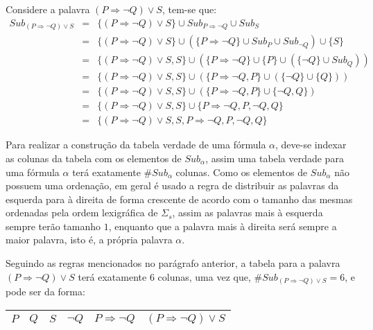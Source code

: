 \begin{exemplo}
  Considere a palavra $(P \Rightarrow \neg Q) \lor S$, tem-se que:
  \begin{eqnarray*}
    Sub_{(P \Rightarrow \neg Q) \lor S} & = & \{(P \Rightarrow \neg Q) \lor S\} \cup Sub_{P \Rightarrow \neg Q} \cup Sub_S\\
    & = & \{(P \Rightarrow \neg Q) \lor S\} \cup (\{P \Rightarrow \neg Q\} \cup Sub_{P} \cup Sub_{\neg Q}) \cup \{S\}\\
    & = & \{(P \Rightarrow \neg Q) \lor S, S\} \cup (\{P \Rightarrow \neg Q\} \cup \{P\} \cup (\{\neg Q\} \cup Sub_{Q}))\\
    & = & \{(P \Rightarrow \neg Q) \lor S, S\} \cup (\{P \Rightarrow \neg Q, P\} \cup (\{\neg Q\} \cup \{Q\}))\\
    & = & \{(P \Rightarrow \neg Q) \lor S, S\} \cup (\{P \Rightarrow \neg Q, P\} \cup \{\neg Q, Q\})\\
    & = & \{(P \Rightarrow \neg Q) \lor S, S\} \cup \{P \Rightarrow \neg Q, P, \neg Q, Q\}\\
    & = & \{(P \Rightarrow \neg Q) \lor S, S, P \Rightarrow \neg Q, P, \neg Q, Q\}
  \end{eqnarray*}
\end{exemplo}

Para realizar a construção da tabela verdade de uma fórmula $\alpha$, deve-se indexar as colunas da tabela com os elementos de $Sub_\alpha$, assim uma tabela verdade para uma fórmula $\alpha$ terá exatamente $\# Sub_\alpha$ colunas. Como os elementos de $Sub_\alpha$ não possuem uma ordenação, em geral é usado a regra de distribuir as palavras da esquerda para à direita de forma crescente de acordo com o tamanho das mesmas ordenadas pela ordem lexigráfica de $\Sigma_s$, assim as palavras mais à esquerda sempre terão tamanho $1$, enquanto que a palavra mais à direita será sempre a maior palavra, isto é, a própria palavra $\alpha$. 

\begin{exemplo}\label{exe:TabelaVerdade1}
  Seguindo as regras mencionados no parágrafo anterior, a tabela para a palavra $(P \Rightarrow \neg Q) \lor S$ terá exatamente $6$ colunas, uma vez que, $\# Sub_{(P \Rightarrow \neg Q) \lor S} = 6$, e pode ser da forma: 

  \begin{table}[H]
    \centering
    \begin{tabular}{|c|c|c|c|c|c|}
      \hline
      $P$ & $Q$ & $S$ & $\neg Q$ & $P \Rightarrow \neg Q$ & $(P \Rightarrow \neg Q) \lor S$\\
      \hline
    \end{tabular}
  \end{table} 
\end{exemplo}


